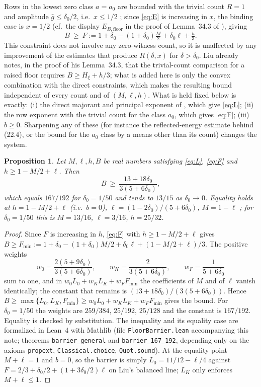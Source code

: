 \documentclass[11pt]{article}
\newtheorem{proposition}{Proposition}
\begin{document}
Rows in the lowest zero class $a=a_0$ are bounded with the trivial count $R=1$ and amplitude $\bar g\le\delta_0/2$, i.e.\ $x\le1/2$ \cite[Lemma~19.2(4)]{Liu26}; since \eqref{eq:E} is increasing in $x$, the binding case is $x=1/2$ (cf.\ the display $E_{B,\mathrm{floor}}$ in the proof of Lemma~34.3 of \cite{Liu26}), giving
\begin{equation}\label{eq:F}
B\ \ge\ F:=1+\delta_0-(1+\delta_0)\tfrac M2+\delta_0\ell+\tfrac h3 .
\end{equation}
This constraint does not involve any zero-witness count, so it is unaffected by any improvement of the estimates that produce $R(\delta,x)$ for $\delta>\delta_0$. Liu already notes, in the proof of his Lemma~34.3, that the trivial-count comparison for a raised floor requires $B\ge H_{\xi}+h/3$; what is added here is only the convex combination with the direct constraints, which makes the resulting bound independent of every count and of $(M,\ell,h)$. What is held fixed below is exactly: (i) the direct majorant and principal exponent of \cite[(22.1), (22.4)]{Liu26}, which give \eqref{eq:L}; (ii) the row exponent \cite[(18.4)]{Liu26} with the trivial count for the class $a_0$, which gives \eqref{eq:F}; (iii) $b\ge0$. Sharpening any of these (for instance the reflected-energy estimate behind (22.4), or the bound for the $a_0$ class by a means other than its count) changes the system.

\begin{proposition}\label{prop:barrier}
Let $M,\ell,h,B$ be real numbers satisfying \eqref{eq:L}, \eqref{eq:F} and $h\ge1-M/2+\ell$. Then
\[
B\ \ge\ \frac{13+18\delta_0}{3(5+6\delta_0)} ,
\]
which equals $167/192$ for $\delta_0=1/50$ and tends to $13/15$ as $\delta_0\to0$. Equality holds at $h=1-M/2+\ell$ (i.e.\ $b=0$), $\ell=(1-2\delta_0)/(5+6\delta_0)$, $M=1-\ell$ ; for $\delta_0=1/50$ this is $M=13/16$, $\ell=3/16$, $h=25/32$.
\end{proposition}
\begin{proof}
Since $F$ is increasing in $h$, \eqref{eq:F} with $h\ge1-M/2+\ell$ gives $B\ge F_{\min}:=1+\delta_0-(1+\delta_0)M/2+\delta_0\ell+(1-M/2+\ell)/3$. The positive weights
\[
w_0=\frac{2(5+9\delta_0)}{3(5+6\delta_0)},\qquad w_K=\frac{2}{3(5+6\delta_0)},\qquad w_F=\frac1{5+6\delta_0}
\]
sum to one, and in $w_0L_0+w_KL_K+w_FF_{\min}$ the coefficients of $M$ and of $\ell$ vanish identically; the constant that remains is $(13+18\delta_0)/(3(5+6\delta_0))$. Hence $B\ge\max\{L_0,L_K,F_{\min}\}\ge w_0L_0+w_KL_K+w_FF_{\min}$ gives the bound. For $\delta_0=1/50$ the weights are $259/384$, $25/192$, $25/128$ and the constant is $167/192$. Equality is checked by substitution. The inequality and its equality case are formalized in Lean~4 with Mathlib (file \texttt{FloorBarrier.lean} accompanying this note; theorems \texttt{barrier\_general} and \texttt{barrier\_167\_192}, depending only on the axioms \texttt{propext}, \texttt{Classical.choice}, \texttt{Quot.sound}). At the equality point $M+\ell=1$ and $b=0$, so the barrier is simply $L_0=11/12-\ell/4$ against $F=2/3+\delta_0/2+(1+3\delta_0/2)\ell$ on Liu's balanced line; $L_K$ only enforces $M+\ell\le1$.
\end{proof}
\end{document}
